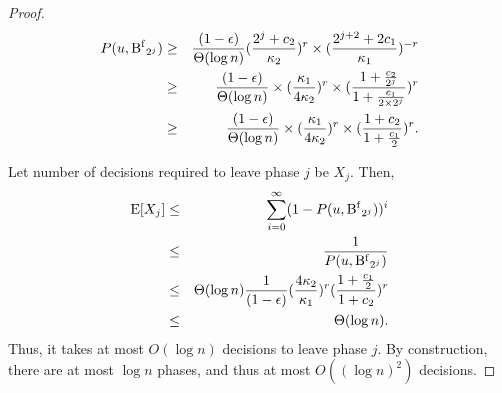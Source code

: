 \begin{proof}
\begin{eqnarray*}
    P(u, \operatorname{B^{f}}_{2^{j}} ) &\ge& \frac{(1-\epsilon)}{\Theta( \log n )} (\frac{2^{j}+c_2}{\kappa_2})^{r} \times (\frac{2^{j+2} + 2 c_1}{\kappa_1})^{-r} \\
    &\ge& \frac{(1-\epsilon)}{\Theta( \log n )} \times (\frac{\kappa_1}{4\kappa_2} )^{r} \times ( \frac{ 1 + \frac{c_2}{2^{j}} }{ 1 + \frac{c_1}{2 \times 2^{j}} })^{r}\\
    &\ge& \frac{(1-\epsilon)}{\Theta( \log n )} \times (\frac{\kappa_1}{4\kappa_2} )^{r} \times ( \frac{ 1 + c_2 }{ 1 + \frac{c_1}{2} })^{r} .\\
\end{eqnarray*}

Let number of decisions required to leave phase $j$ be $X_j$. Then, 
\begin{eqnarray*}
    \operatorname{E}[X_j] &\le& \sum_{i=0}^{\infty} (1 - P(u, \operatorname{B^{f}}_{2^{j}} ))^i \\
            &\le& \frac{1}{P(u, \operatorname{B^{f}}_{2^{j}} )} \\
            &\le& \Theta( \log n ) \frac{1}{(1-\epsilon)} (\frac{4 \kappa_2}{\kappa_1})^{r} ( \frac{ 1 + \frac{c_1}{2} }{ 1 + c_2 })^{r}\\
            &\le& \Theta( \log n ).
\end{eqnarray*}
Thus, it takes at most $O(\log n)$ decisions to leave phase $j$. By construction, there are at most $\log n$
phases, and thus at most $O((\log n)^2)$ decisions.
\end{proof}

